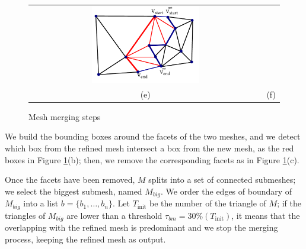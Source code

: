 \begin{figure}[tpb]
\begin{tabular}{cc}
\includegraphics[width=0.475\textwidth]{./img/ch-incr-dens/meshmerge06new}\\
(e)&(f)\\
\end{tabular}
\caption{Mesh merging steps}
\label{fig:mesh_merging}
\end{figure}

We build the bounding boxes around the facets of the two meshes, and we detect which box from the refined mesh intersect a box from the new mesh, as the red boxes in Figure \ref{fig:mesh_merging}(b); then, we remove the corresponding facets as in Figure \ref{fig:mesh_merging}(c).

Once the facets have been removed, $\mathit{M}$ splits into a set of connected submeshes; we select the biggest submesh, named  $\mathit{{M}_{big}}$.
We order the edges of boundary of $\mathit{{M}_{big}}$ into a list $\mathit{b} = \{b_1, \dots,  b_n\}$.
Let $T_{\text{init}}$ be the number of the triangle of  $\mathit{M}$; if the triangles of $\mathit{{M}_{big}}$ are lower than a threshold $\tau_{bm}=30\% (T_{\text{init}})$, it means that the overlapping with the refined mesh is predominant and we stop the merging process, keeping the refined mesh as output.

